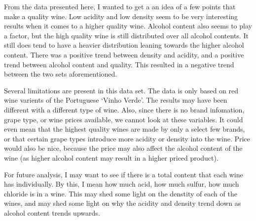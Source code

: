 \documentclass[]{article}
\begin{document}
From the data presented here, I wanted to get a an idea of a few points
that make a quality wine. Low acidity and low density seem to be very
interesting results when it comes to a higher quality wine. Alcohol
content also seems to play a factor, but the high quality wine is still
distributed over all alcohol contents. It still does tend to have a
heavier distribution leaning towards the higher alcohol content. There
was a positive trend between density and acidity, and a positive trend
between alcohol content and quality. This resulted in a negative trend
between the two sets aforementioned.

Several limitations are present in this data set. The data is only based
on red wine varients of the Portuguese `Vinho Verde'. The results may
have been different with a different type of wine. Also, since there is
no brand infomation, grape type, or wine prices available, we cannot
look at these variables. It could even mean that the highest quality
wines are made by only a select few brands, or that certain grape types
introduce more acidity or density into the wine. Price would also be
nice, because the price may also affect the alcohol content of the wine
(as higher alcohol content may result in a higher priced product).

For future analysis, I may want to see if there is a total content that
each wine has individually. By this, I mean how much acid, how much
sulfur, how much chloride is in a wine. This may shed some light on the
denstity of each of the wines, and may shed some light on why the
acidity and density trend down as alcohol content trends upwards.
\end{document}
